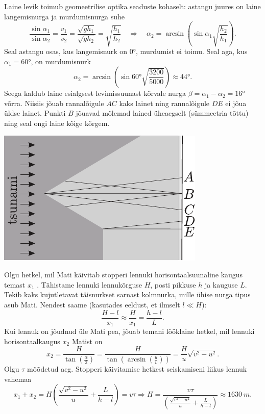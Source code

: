 \documentclass[10pt, twoside]{article}
\begin{document}
{%

\solu
Laine levik toimub geomeetrilise optika seaduste kohaselt: astangu juures on laine langemisnurga ja murdumisnurga suhe
\[
\frac{\sin \alpha_{1}}{\sin \alpha_{2}}=\frac{v_{1}}{v_{2}}=\frac{\sqrt{g h_{1}}}{\sqrt{g h_{2}}}=\sqrt{\frac{h_{1}}{h_{2}}} \quad\Rightarrow\quad \alpha_{2}=\arcsin \left(\sin \alpha_{1} \sqrt{\frac{h_{2}}{h_{1}}}\right).
\]
Seal astangu osas, kus langemisnurk on \ang{0}, murdumist ei toimu. Seal aga, kus $\alpha_1 = \ang{60}$, on murdumisnurk
\[
\alpha_{2}=\arcsin \left(\sin \ang{60} \sqrt{\frac{3200}{5000}}\right) \approx \ang{44}.
\]
Seega kaldub laine esialgsest levimissuunast kõrvale nurga $\beta = \alpha_1 -\alpha_2 = \ang{16}$ võrra. Niisiis jõuab rannalõigule $AC$ kaks lainet ning rannalõigule $DE$ ei jõua üldse lainet. Punkti $B$ jõuavad mõlemad lained üheaegselt (sümmeetria tõttu) ning seal ongi laine kõige kõrgem.

\begin{center}
	\includegraphics[width=0.6\linewidth]{2005-v3g-06-lah}
\end{center}
\probend
\bigskip


\solu
Olgu hetkel, mil Mati käivitab stopperi lennuki horisontaalsuunaline kaugus
temast $x_{1}$ . Tähistame lennuki lennukõrguse $H$, posti pikkuse $h$ ja
kauguse
$L$. Tekib kaks kujutletavat täisnurkset sarnast kolmnurka, mille ühise nurga
tipus asub Mati. Nendest saame (kasutades eeldust, et ilmselt $l\ll H$):
\[\frac{H-l}{x_{1}}\approx\frac{H}{x_{1}}=\frac{h-l}{L}. \]
Kui lennuk on jõudnud üle Mati pea, jõuab temani lööklaine hetkel, mil lennuki horisontaalkaugus $x_{2}$ Matist on
\[ x_{2}=\frac{H}{\tan\left(\frac{\alpha}{2}\right)}=\frac{H}{\tan\left(\arcsin\left(\frac{u}{v}\right)\right)}=\frac{H}{u}\sqrt{v^2-u^2}.
\]
Olgu $\tau$ mõõdetud aeg. Stopperi käivitamise hetkest seiskamiseni liikus lennuk vahemaa
\[ x_1+x_2=H\left(\frac{\sqrt{v^2-u^2}}{u} +\frac{L}{h-l}\right)=v\tau
\Rightarrow
H=\frac{v\tau}{\left(\frac{\sqrt{v^2-u^2}}{u} +\frac{L}{h-l}\right)}\approx
\SI{1630}{m}.
\]
\probend
\bigskip

}
\end{document}

